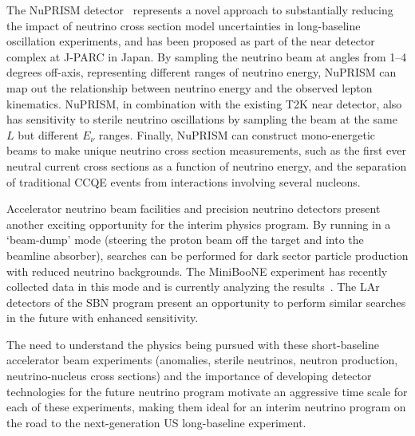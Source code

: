 The NuPRISM detector~\cite{Bhadra:2014oma} represents a novel approach
to substantially reducing the impact of neutrino cross section model
uncertainties in long-baseline oscillation experiments, and has been
proposed as part of the near detector complex at J-PARC in Japan. By
sampling the neutrino beam at angles from 1--4 degrees off-axis,
representing different ranges of neutrino energy, NuPRISM can map out
the relationship between neutrino energy and the observed lepton
kinematics. NuPRISM, in combination with the existing T2K near
detector, also has sensitivity to sterile neutrino oscillations by
sampling the beam at the same $L$ but different $E_{\nu}$
ranges. Finally, NuPRISM can construct mono-energetic beams to make
unique neutrino cross section measurements, such as the first ever
neutral current cross sections as a function of neutrino energy, and
the separation of traditional CCQE events from interactions involving
several nucleons.

Accelerator neutrino beam facilities and precision neutrino detectors
present another exciting opportunity for the interim physics program.
By running in a `beam-dump' mode (steering the proton beam off the
target and into the beamline absorber), searches can be performed for
dark sector particle production with reduced neutrino backgrounds.
The MiniBooNE experiment has recently collected data in this mode and
is currently analyzing the
results~\cite{Dharmapalan:2012xp,Thornton:2014ufa}.  The LAr detectors
of the SBN program present an opportunity to perform similar searches
in the future with enhanced sensitivity.

The need to understand the physics being pursued with these
short-baseline accelerator beam experiments (anomalies, sterile
neutrinos, neutron production, neutrino-nucleus cross sections) and
the importance of developing detector technologies for the future
neutrino program motivate an aggressive time scale for each of these
experiments, making them ideal for an interim neutrino program on the
road to the next-generation US long-baseline experiment.
